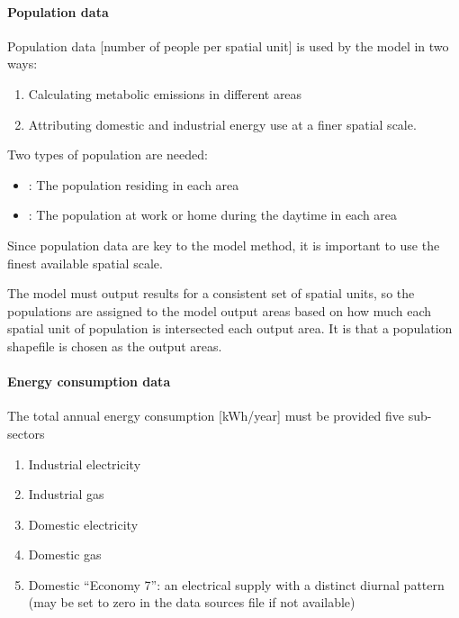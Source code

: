 \documentclass[letterpaper,10pt,english]{sphinxmanual}
\begin{document}
\paragraph{Population data}
\label{\detokenize{OtherManuals/GQF_Manual:population-data}}
Population data {[}number of people per spatial unit{]} is used by the model
in two ways:
\begin{enumerate}
\item {} 
Calculating metabolic emissions in different areas

\item {} 
Attributing domestic and industrial energy use at a finer spatial
scale.

\end{enumerate}

Two types of population are needed:
\begin{itemize}
\item {} 
: The population residing in each
area

\item {} 
: The population at work or home during
the daytime in each area

\end{itemize}

Since population data are key to the model method, it is important to
use the finest available spatial scale.

The model must output results for a consistent set of spatial units, so
the populations are assigned to the model output areas based on how much
each spatial unit of population is intersected each output area. It is
 that a population shapefile is chosen as the output
areas.


\paragraph{Energy consumption data}
\label{\detokenize{OtherManuals/GQF_Manual:energy-consumption-data}}
The total annual energy consumption {[}kWh/year{]} must be provided five
sub-sectors
\begin{enumerate}
\item {} 
Industrial electricity

\item {} 
Industrial gas

\item {} 
Domestic electricity

\item {} 
Domestic gas

\item {} 
Domestic “Economy 7”: an electrical supply with a distinct diurnal
pattern (may be set to zero in the data sources file if not
available)

\end{enumerate}
\end{document}

